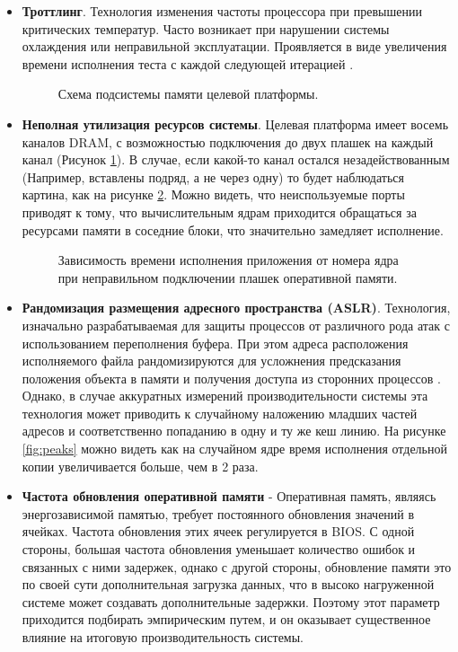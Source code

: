 \begin{itemize}
	\item  \textbf{Троттлинг}. Технология изменения частоты процессора при превышении критических температур. Часто возникает при нарушении системы охлаждения или неправильной эксплуатации. Проявляется в виде увеличения времени исполнения теста с каждой следующей итерацией \cite{zhang2009hardware}.
		\begin{figure}[ht]
		\caption{Схема подсистемы памяти целевой платформы.}\label{fig:ddrsvg1}
	\end{figure}
	\item  \textbf{Неполная утилизация ресурсов системы}. Целевая платформа имеет восемь каналов DRAM, с возможностью подключения до двух плашек на каждый канал (Рисунок \ref{fig:ddrsvg1}). В случае, если какой-то канал остался незадействованным (Например, вставлены подряд, а не через одну) то будет наблюдаться картина, как на рисунке \ref{fig:lack_of_memmory}. Можно видеть, что неиспользуемые порты приводят к тому, что вычислительным ядрам приходится обращаться за ресурсами памяти в соседние блоки, что значительно замедляет исполнение.

	
	\begin{figure}[ht]
		\caption{Зависимость времени исполнения приложения от номера ядра при неправильном подключении плашек оперативной памяти.}\label{fig:lack_of_memmory}
	\end{figure}
	\item \textbf{Рандомизация размещения адресного пространства (ASLR)}. Технология, изначально разрабатываемая для защиты процессов от различного рода атак с использованием  переполнения буфера. При этом  адреса расположения исполняемого файла рандомизируются для усложнения предсказания положения объекта в памяти и получения доступа из сторонних процессов \cite{gras2017aslr}. Однако, в случае аккуратных измерений производительности системы эта технология может приводить к случайному наложению младших частей адресов и соответственно попаданию в одну и ту же кеш линию. На рисунке \ref{fig:peaks}  можно видеть как на случайном ядре время исполнения отдельной копии увеличивается больше, чем в 2 раза.
	\item \textbf{Частота обновления оперативной памяти} - Оперативная память, являясь энергозависимой памятью, требует постоянного обновления значений в ячейках. Частота обновления этих ячеек регулируется в BIOS. С одной стороны, большая частота обновления уменьшает количество ошибок и связанных с ними задержек, однако с другой стороны, обновление памяти это по своей сути дополнительная загрузка данных, что в высоко нагруженной системе может создавать дополнительные задержки. Поэтому этот параметр приходится подбирать эмпирическим путем, и он оказывает существенное влияние на итоговую производительность системы.
	

\end{itemize}
